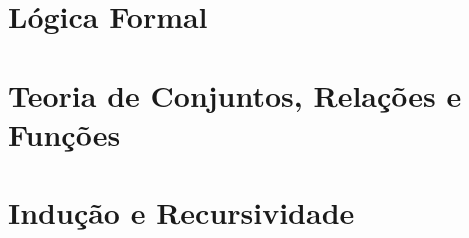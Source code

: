 \documentclass[a4paper]{book}
\theoremstyle{definition}
\begin{document}
\tableofcontents

\mainmatter



%

\part{L\'ogica Formal}






\part{Teoria de Conjuntos, Relações e Funções}






\part{Indução e Recursividade}





\appendix
{}



\end{document}
